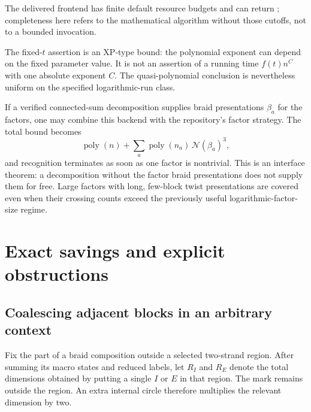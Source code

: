 \documentclass[11pt,letterpaper]{article}
\theoremstyle{definition}
\newcommand{\poly}{\operatorname{poly}}
\newcommand{\N}{\mathcal N}
\newcommand{\code}[1]{\texttt{\detokenize{#1}}}
\begin{document}
The delivered frontend has finite default resource budgets and can return \code{UNKNOWN}; completeness here refers to the mathematical algorithm without those cutoffs, not to a bounded invocation.

The fixed-\(t\) assertion is an XP-type bound: the polynomial exponent can depend on the fixed parameter value. It is not an assertion of a running time \(f(t)n^C\) with one absolute exponent \(C\). The quasi-polynomial conclusion is nevertheless uniform on the specified logarithmic-run class.

If a verified connected-sum decomposition supplies braid presentations \(\beta_a\) for the factors, one may combine this backend with the repository's factor strategy. The total bound becomes
\[
 \poly(n)+\sum_a\poly(n_a)\,\N(\beta_a)^3,
\]
and recognition terminates as soon as one factor is nontrivial. This is an interface theorem: a decomposition without the factor braid presentations does not supply them for free. Large factors with long, few-block twist presentations are covered even when their crossing counts exceed the previously useful logarithmic-factor-size regime.

\section{Exact savings and explicit obstructions}\label{sec:merge}
\subsection{Coalescing adjacent blocks in an arbitrary context}
Fix the part of a braid composition outside a selected two-strand region. After summing its macro states and reduced labels, let \(R_I\) and \(R_E\) denote the total dimensions obtained by putting a single \(I\) or \(E\) in that region. The mark remains outside the region. An extra internal circle therefore multiplies the relevant dimension by two.
\end{document}
